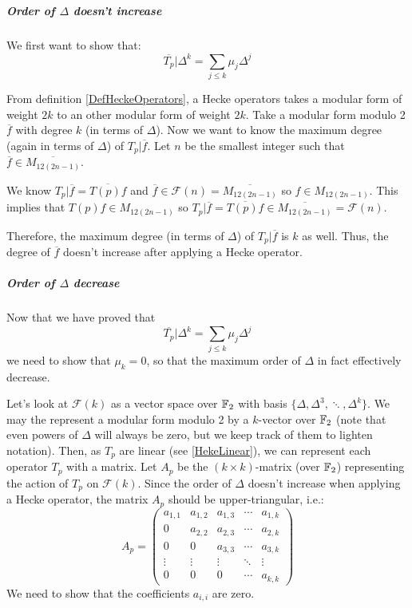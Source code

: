 \subparagraph{Order of $\Delta$ doesn't increase}
We first want to show that:
$$
\overline{T_p}| \Delta^k = \sum_{j \leq k} \mu_j \Delta^j
$$

From definition \ref{DefHeckeOperators}, a Hecke operators takes a modular form of weight $2k$ to an other modular form of weight $2k$.
Take a modular form modulo 2 $\overline{f}$ with degree $k$ (in terms of $\Delta$).
Now we want to know the maximum degree (again in terms of $\Delta$) of $T_p|\overline{f}$.
Let $n$ be the smallest integer such that $\overline{f} \in \overline{M_{12(2n-1)}}$.

We know $T_p|\overline{f} = \overline{T(p)f}$ and $\overline{f} \in \mathcal{F}(n) = \overline{M_{12(2n-1)}}$ so $f \in M_{12(2n-1)}$.
This implies that $T(p)f \in M_{12(2n-1)}$ so $T_p|\overline{f} = \overline{T(p)f} \in \overline{M_{12(2n-1)}} = \mathcal{F}(n)$.

Therefore, the maximum degree (in terms of $\Delta$) of $T_p|\overline{f}$ is $k$ as well.
Thus, the degree of $\overline{f}$ doesn't increase after applying a Hecke operator.

\subparagraph{Order of $\Delta$ decrease}
\label{orderDecrease}
Now that we have proved that 
$$
\overline{T_p}| \Delta^k = \sum_{j \leq k} \mu_j \Delta^j
$$
we need to show that $\mu_k = 0$, so that the maximum order of $\Delta$ in fact effectively decrease.

Let's look at $\mathcal{F}(k)$ as a vector space over $\mathbb{F}_2$ with basis $\{ \Delta, \Delta^3, \ddots, \Delta^k \}$.
We may the represent a modular form modulo 2 by a $k$-vector over $\mathbb{F}_2$ (note that even powers of $\Delta$ will always be zero, but we keep track of them to lighten notation).
Then, as $T_p$ are linear (see \ref{HekeLinear}), we can represent each operator $T_p$ with a matrix.
Let $A_p$ be the $(k \times k)$-matrix (over $\mathbb{F}_2$) representing the action of $T_p$ on $\mathcal{F}(k)$.
Since the order of $\Delta$ doesn't increase when applying a Hecke operator, the matrix $A_p$ should be upper-triangular, i.e.:
$$
A_p = 
\begin{pmatrix}
a_{1,1} & a_{1,2} & a_{1,3} & \cdots & a_{1,k} \\
   0    & a_{2,2} & a_{2,3} & \cdots & a_{2,k} \\
   0    &    0    & a_{3,3} & \cdots & a_{3,k} \\
\vdots  & \vdots  & \vdots  & \ddots & \vdots  \\
   0    &    0    &    0    & \cdots & a_{k,k}
\end{pmatrix}
$$
We need to show that the coefficients $a_{i,i}$ are zero.

